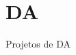 \chapter{DA }
\hypertarget{md__r_e_a_d_m_e}{}\label{md__r_e_a_d_m_e}
\label{md__r_e_a_d_m_e_autotoc_md1}%
%


Projetos de DA 
